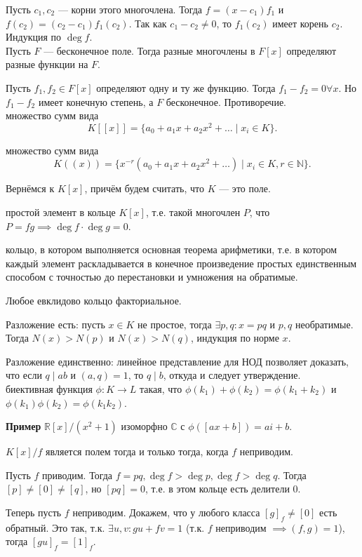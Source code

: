 \documentclass[12pt,a4paper]{article}
\begin{document}
\proof Пусть $c_1,c_2$ --- корни этого многочлена. Тогда $f=(x-c_1)f_1$ и $f(c_2)=(c_2-c_1)f_1(c_2)$. Так как $c_1-c_2\neq 0$, то $f_1(c_2)$ имеет корень $c_2$. Индукция по $\deg f$.\QEDA\\

\lemma Пусть $F$ --- бесконечное поле. Тогда разные многочлены в $F[x]$ определяют разные функции на $F$.

\proof Пусть $f_1,f_2\in F[x]$ определяют одну и ту же функцию. Тогда $f_1-f_2=0\forall x$. Но $f_1-f_2$ имеет конечную степень, а $F$ бесконечное. Противоречие. \QEDA\\

 множество сумм вида \[
	K[[x]]=\{a_0+a_1x+a_2x^2+\ldots \mid x_i\in K\}
.\]

 множество сумм вида \[
	K((x))=\{x^{-r}(a_0+a_1x+a_2x^2+\ldots) \mid x_i\in K,r\in \mathbb N\}
.\]

Вернёмся к $K[x]$, причём будем считать, что $K$ --- это поле. 

 простой элемент в кольце $K[x]$, т.е. такой многочлен $P$, что $P=fg\implies \deg f\cdot \deg g=0$.

 кольцо, в котором выполняется основная теорема арифметики, т.е. в котором каждый элемент раскладывается в конечное произведение простых единственным способом с точностью до перестановки и умножения на обратимые.

\lemma Любое евклидово кольцо факториальное.

\proof Разложение есть: пусть $x\in K$ не простое, тогда $\exists p,q:x=pq$ и $p,q$ необратимые. Тогда $N(x)>N(p)$ и $N(x)>N(q)$, индукция по норме $x$.

Разложение единственно: линейное представление для НОД позволяет доказать, что если $q\mid ab$ и $(a,q)=1$, то $q\mid b$, откуда и следует утверждение.\QEDA\\

 биективная функция $\phi:K\to L$ такая, что $\phi(k_1)+\phi(k_2)=\phi(k_1+k_2)$ и $\phi(k_1)\phi(k_2)=\phi(k_1k_2)$.

\textbf{Пример} $\mathbb R[x] /(x^2+1)$ изоморфно $\mathbb C$ с $\phi([ax+b])=ai+b$.

\newpage

\theorem $K[x] /f$ является полем тогда и только тогда, когда $f$ неприводим.

\proof Пусть $f$ приводим. Тогда $f=pq,\deg f>\deg p,\deg f>\deg q$. Тогда $[p]\neq [0]\neq [q]$, но $[pq]=0$, т.е. в этом кольце есть делители 0.

Теперь пусть $f$ неприводим. Докажем, что у любого класса $[g]_f\neq [0]$ есть обратный. Это так, т.к. $\exists u,v:gu+fv=1$ (т.к. $f$ неприводим $\implies (f,g)=1$), тогда $[gu]_f=[1]_f$. \QEDA\\
\end{document}
